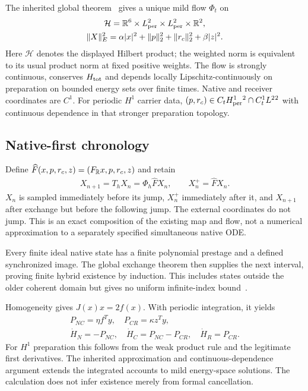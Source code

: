 The inherited global theorem~\cite[Theorem 3.1]{rx} gives a unique mild flow $\Phi_t$ on
\begin{equation}\label{eq:a07}%
\begin{gathered}
\mathcal H=\mathbb R^6\times L^2_{\rm per}\times L^2_{\rm per}\times\mathbb R^2,\\ \|X\|_E^2=\alpha|x|^2+\|p\|_2^2+\|r_c\|_2^2+\beta|z|^2.
\end{gathered}
\end{equation}
Here $\mathcal H$ denotes the displayed Hilbert product; the weighted norm is equivalent to its usual product norm at fixed positive weights. The flow is strongly continuous, conserves $H_{\rm tot}$ and depends locally Lipschitz-continuously on preparation on bounded energy sets over finite times. Native and receiver coordinates are $C^1$. For periodic $H^1$ carrier data, $(p,r_c)\in C_tH^1_{\rm per}{}^2\cap C_t^1L^2{}^2$ with continuous dependence in that stronger preparation topology.

\subsection{Native-first chronology}\label{sec:hybrid}
Define $\widehat F(x,p,r_c,z)=(F_{\mathbb R}x,p,r_c,z)$ and retain
\begin{equation}\label{eq:a08}%
\begin{gathered}
X_{n+1}=T_hX_n=\Phi_h\widehat F X_n,\qquad X_n^+=\widehat F X_n.
\end{gathered}
\end{equation}
$X_n$ is sampled immediately before its jump, $X_n^+$ immediately after it, and $X_{n+1}$ after exchange but before the following jump. The external coordinates do not jump. This is an exact composition of the existing map and flow, not a numerical approximation to a separately specified simultaneous native ODE.

Every finite ideal native state has a finite polynomial prestage and a defined synchronized image. The global exchange theorem then supplies the next interval, proving finite hybrid existence by induction. This includes states outside the older coherent domain but gives no uniform infinite-index bound~\cite[Section 6, limits]{rx}.

Homogeneity gives $J(x)x=2f(x)$. With periodic integration, it yields
\begin{equation}\label{eq:a09}%
\begin{gathered}
P_{NC}=\eta f^Ty,\quad P_{CR}=\kappa z^Ty,\\ \dot H_N=-P_{NC},\quad\dot H_C=P_{NC}-P_{CR},\quad\dot H_R=P_{CR}.
\end{gathered}
\end{equation}
For $H^1$ preparation this follows from the weak product rule and the legitimate first derivatives. The inherited approximation and continuous-dependence argument extends the integrated accounts to mild energy-space solutions. The calculation does not infer existence merely from formal cancellation.
